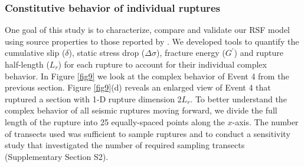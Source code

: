 \documentclass[preprint,1p, 10pt,authoryear]{elsarticle}
\begin{document}
\subsubsection{Constitutive behavior of individual ruptures }
\label{Constitutive}
One goal of this study is to characterize, compare and validate our RSF model using source properties to those reported by \citet{Selvadurai2019}. We developed tools to quantify the cumulative slip ($\delta$), static stress drop ($\Delta \sigma$), fracture energy ($G^{'}$) and rupture half-length ($L_{r}$) for each rupture to account for their individual complex behavior. In Figure \ref{fig9} we look at the complex behavior of Event 4 from the previous section. Figure \ref{fig9}(d) reveals an enlarged view of Event 4 that ruptured a section with 1-D rupture dimension $2L_{r}$.  To better understand the complex behavior of all seismic ruptures moving forward, we divide the full length of the rupture into 25 equally-spaced points along the $x$-axis. The number of transects used was sufficient to sample ruptures and to conduct a sensitivity study that investigated the number of required sampling transects (Supplementary Section S2).   
\end{document}
